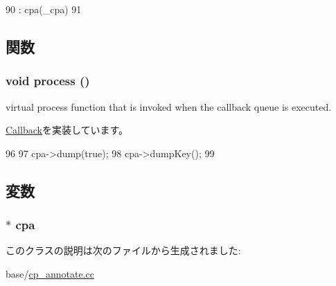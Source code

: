 \begin{DoxyCode}
90         : cpa(_cpa)
91     {}
\end{DoxyCode}


\subsection{関数}
\hypertarget{classAnnotateDumpCallback_a2e9c5136d19b1a95fc427e0852deab5c}{
\subsubsection[{process}]{\setlength{\rightskip}{0pt plus 5cm}void process ()}}
\label{classAnnotateDumpCallback_a2e9c5136d19b1a95fc427e0852deab5c}
virtual process function that is invoked when the callback queue is executed. 

\hyperlink{classCallback_a142b75b68a6291400e20fb0dd905b1c8}{Callback}を実装しています。


\begin{DoxyCode}
96 {
97     cpa->dump(true);
98     cpa->dumpKey();
99 }
\end{DoxyCode}


\subsection{変数}
\hypertarget{classAnnotateDumpCallback_ad3738d2e08f4ea21f1c3721f2492c9c2}{
\subsubsection[{cpa}]{$\ast$ {\bf cpa}}}
\label{classAnnotateDumpCallback_ad3738d2e08f4ea21f1c3721f2492c9c2}


このクラスの説明は次のファイルから生成されました:\begin{DoxyCompactItemize}
\item 
base/\hyperlink{cp__annotate_8cc}{cp\_\-annotate.cc}\end{DoxyCompactItemize}
